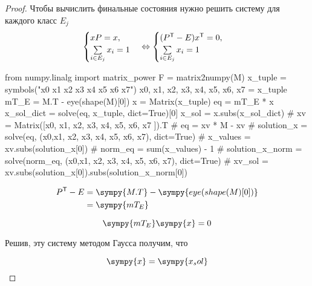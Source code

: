 \begin{proof}
    Чтобы вычислить финальные состояния нужно решить систему для каждого класс $E_j$
    \[
        \begin{aligned}
            \begin{cases}
                xP           = x, \\
                \sum\limits_{i \in E_j} x_i = 1
            \end{cases}
            \Leftrightarrow
            \begin{cases}
                (P^{\mathsf{T}} - E) x^{\mathsf{T}}            = 0 , \\
                \sum\limits_{i \in E_j} x_i = 1
            \end{cases}
        \end{aligned}
    \]

    \begin{sympycode}
from numpy.linalg import matrix_power
F = matrix2numpy(M)
x_tuple = symbols("x0 x1 x2 x3 x4 x5 x6 x7")
x0, x1, x2, x3, x4, x5, x6, x7 = x_tuple
mT_E = M.T - eye(shape(M)[0])
x = Matrix(x_tuple)
eq = mT_E * x
x_sol_dict = solve(eq, x_tuple, dict=True)[0]
x_sol = x.subs(x_sol_dict)
# xv = Matrix([x0, x1, x2, x3, x4, x5, x6, x7 ]).T
# eq = xv * M - xv
# solution_x = solve(eq, (x0,x1, x2, x3, x4, x5, x6, x7), dict=True)
# x_values = xv.subs(solution_x[0])
# norm_eq = sum(x_values) - 1
# solution_x_norm = solve(norm_eq,  (x0,x1, x2, x3, x4, x5, x6, x7), dict=True)
# xv_sol = xv.subs(solution_x[0]).subs(solution_x_norm[0])
\end{sympycode}


    \[
        \begin{aligned}
            P\transpose - E & = \sympy{M.T} - \sympy{eye(shape(M)[0])} \\
                            & = \sympy{mT_E}
        \end{aligned}
    \]

    \[
        \sympy{mT_E}\sympy{x} = 0
    \]

    Решив, эту систему методом Гаусса получим, что

    \[
        \sympy{x} = \sympy{x_sol}
    \]


\end{proof}

